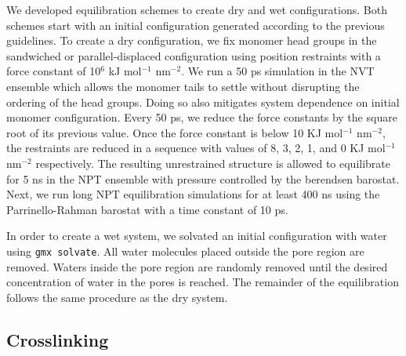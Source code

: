 \documentclass{article}
\begin{document}
  We developed equilibration schemes to create dry and wet configurations. Both
  schemes start with an initial configuration generated according to the previous
  guidelines. To create a dry configuration, we fix monomer head groups in the
  sandwiched or parallel-displaced configuration using position restraints with a
  force constant of 10$^6$ kJ mol$^{-1}$ nm$^{-2}$. We run a 50 ps simulation in
  the NVT ensemble which allows the monomer tails to settle without disrupting
  the ordering of the head groups. Doing so also mitigates system dependence on
  initial monomer configuration. Every 50 ps, we reduce the force constants by
  the square root of its previous value. Once the force constant is below 10 KJ
  mol$^{-1}$ nm$^{-2}$, the restraints are reduced in a sequence with values of
  8, 3, 2, 1, and 0 KJ mol$^{-1}$ nm$^{-2}$ respectively. The resulting
  unrestrained structure is allowed to equilibrate for 5 ns in the NPT ensemble
  with pressure controlled by the berendsen barostat. Next, we run long NPT
  equilibration simulations for at least 400 ns using the Parrinello-Rahman
  barostat with a time constant of 10 ps.

  In order to create a wet system, we solvated an initial configuration with
  water using \texttt{gmx solvate}. All water molecules placed outside the pore
  region are removed. Waters inside the pore region are randomly removed until
  the desired concentration of water in the pores is reached. The remainder of
  the equilibration follows the same procedure as the dry system. 

  \subsection{Crosslinking}
  
\end{document}
